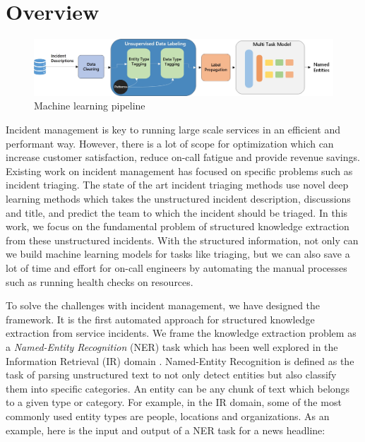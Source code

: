 \section{Overview}

\begin{figure}
\includegraphics[width=1\textwidth]{Figures/System_Architecture_Diagram.jpg}
\caption{Machine learning pipeline}
\label{fig:overview}
\end{figure}

Incident management is key to running large scale services in an efficient and performant way. However, there is a lot of scope for optimization which can increase customer satisfaction, reduce on-call fatigue and provide revenue savings. Existing work on incident management has focused on specific problems such as incident triaging. The state of the art incident triaging methods \cite{ContinuousTriageASE2019} use novel deep learning methods which takes the unstructured incident description, discussions and title, and predict the team to which the incident should be triaged. In this work, we focus on the fundamental problem of structured knowledge extraction from these unstructured incidents. With the structured information, not only can we build machine learning models for tasks like triaging, but we can also save a lot of time and effort for on-call engineers by automating the manual processes such as running health checks on resources.

To solve the challenges with incident management, we have designed the \softner{} framework. It is the first automated approach for structured knowledge extraction from service incidents. We frame the knowledge extraction problem as a \textit{Named-Entity Recognition} (NER) task which has been well explored in the Information Retrieval (IR) domain \cite{nadeau2007survey, lample2016neural}. Named-Entity Recognition is defined as the task of parsing unstructured text to not only detect entities but also classify them into specific categories. An entity can be any chunk of text which belongs to a given type or category. For example, in the IR domain, some of the most commonly used entity types are people, locations and organizations. As an example, here is the input and output of a NER task for a news headline:

